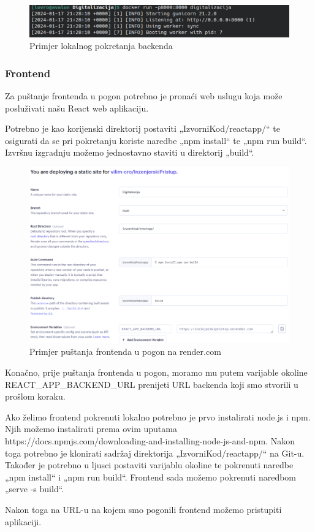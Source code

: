 			\begin{figure}[H]
				\includegraphics[width=\textwidth]{slike/runBackendLocal.png}
				\caption{Primjer lokalnog pokretanja backenda}
				\label{fig:lokalno-pokretanje-backenda}
			\end{figure}


			\subsubsection{Frontend}

			Za puštanje frontenda u pogon potrebno je pronaći web uslugu koja može posluživati našu React web aplikaciju.

			Potrebno je kao korijenski direktorij postaviti „IzvorniKod/reactapp/“ te osigurati da se pri pokretanju koriste
			naredbe „npm install“ te „npm run build“. Izvršnu izgradnju možemo jednostavno staviti u direktorij „build“. 

			\begin{figure}[H]
				\includegraphics[width=\textwidth]{slike/deployingFrontend.png}
				\caption{Primjer puštanja frontenda u pogon na render.com}
				\label{fig:lokalno-pokretanje-backenda}
			\end{figure}

			Konačno, prije puštanja frontenda u pogon, moramo mu putem varijable okoline REACT_APP_BACKEND_URL prenijeti URL
			backenda koji smo stvorili u prošlom koraku.

			Ako želimo frontend pokrenuti lokalno potrebno je prvo instalirati node.js i npm. Njih možemo instalirati prema ovim
			uputama https://docs.npmjs.com/downloading-and-installing-node-js-and-npm.
			Nakon toga potrebno je klonirati sadržaj direktorija „IzvorniKod/reactapp/“ na Git-u. Također je potrebno u ljusci
			postaviti varijablu okoline te pokrenuti naredbe „npm install“ i „npm run build“. Frontend sada možemo pokrenuti
			naredbom „serve -s build“. 

			Nakon toga na URL-u na kojem smo pogonili frontend možemo pristupiti aplikaciji.
	
			\eject 